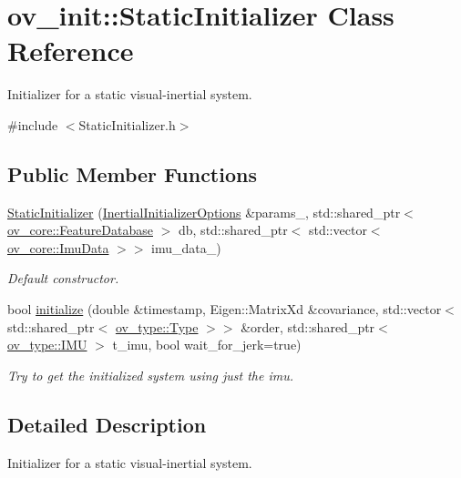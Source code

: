 \hypertarget{classov__init_1_1StaticInitializer}{}\section{ov\+\_\+init\+:\+:Static\+Initializer Class Reference}
\label{classov__init_1_1StaticInitializer}


Initializer for a static visual-\/inertial system.  




{\ttfamily \#include $<$Static\+Initializer.\+h$>$}

\subsection*{Public Member Functions}
\begin{DoxyCompactItemize}
\item 
\hyperlink{classov__init_1_1StaticInitializer_a7c0e4dfac3e8d54a2303fe2cc3137026}{Static\+Initializer} (\hyperlink{structov__init_1_1InertialInitializerOptions}{Inertial\+Initializer\+Options} \&params\+\_\+, std\+::shared\+\_\+ptr$<$ \hyperlink{classov__core_1_1FeatureDatabase}{ov\+\_\+core\+::\+Feature\+Database} $>$ db, std\+::shared\+\_\+ptr$<$ std\+::vector$<$ \hyperlink{structov__core_1_1ImuData}{ov\+\_\+core\+::\+Imu\+Data} $>$$>$ imu\+\_\+data\+\_\+)
\begin{DoxyCompactList}\small\item\em Default constructor. \end{DoxyCompactList}\item 
bool \hyperlink{classov__init_1_1StaticInitializer_af7f232bd33243300a7e0f212efb72232}{initialize} (double \&timestamp, Eigen\+::\+Matrix\+Xd \&covariance, std\+::vector$<$ std\+::shared\+\_\+ptr$<$ \hyperlink{classov__type_1_1Type}{ov\+\_\+type\+::\+Type} $>$$>$ \&order, std\+::shared\+\_\+ptr$<$ \hyperlink{classov__type_1_1IMU}{ov\+\_\+type\+::\+I\+MU} $>$ t\+\_\+imu, bool wait\+\_\+for\+\_\+jerk=true)
\begin{DoxyCompactList}\small\item\em Try to get the initialized system using just the imu. \end{DoxyCompactList}\end{DoxyCompactItemize}


\subsection{Detailed Description}
Initializer for a static visual-\/inertial system. 

